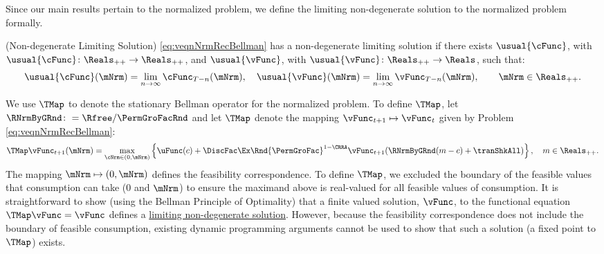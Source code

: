 \documentclass[BufferStockTheory]{subfiles}
\begin{document}
\hypertarget{sensible}{}\hypertarget{useful}{}
\hypertarget{Definition-of-a-Nondegenerate-Solution and Bellman}{}
Since our main results pertain to the normalized problem, we define the limiting non-degenerate solution to the normalized problem formally.

\begin{definition}\label{def:nondegeneracy}(Non-degenerate Limiting Solution)
\ref{eq:veqnNrmRecBellman} has a non-degenerate limiting solution if there exists $ \usual{\cFunc}$, with $\usual{\cFunc}\colon \Reals_{++}\rightarrow \Reals_{++}$, and $ \usual{\vFunc}$, with $\usual{\vFunc}\colon \Reals_{++}\rightarrow \Reals$, such that:
%
\begin{align*}
  \usual{\cFunc}(\mNrm) =  \lim_{n \rightarrow \infty} \cFunc_{T-n}(\mNrm), \quad \usual{\vFunc}(\mNrm)  =  \lim_{n \rightarrow \infty} \vFunc_{T-n}(\mNrm), \qquad \mNrm \in \Reals_{++} \notag.
\end{align*}
\end{definition}


\hypertarget{Stationary-Bellman-Operator}{}

We use $\TMap$ to denote the stationary Bellman operator for the normalized problem. To define $\TMap$, let $\RNrmByGRnd \colon = \Rfree/\PermGroFacRnd$ and let $\TMap$ denote the mapping $\vFunc_{t+1} \mapsto \vFunc_{t}$ given by Problem \ref{eq:veqnNrmRecBellman}:
%
\begin{equation}\label{eq:maintmap}
  \TMap \vFunc_{t+1}(\mNrm) = \max_{\cNrm \in (0, \mNrm) }  \left\{
    \uFunc(c) + \DiscFac\Ex\Rnd{\PermGroFac}^{1-\CRRA}\vFunc_{t+1}(\RNrmByGRnd(m - c) + \tranShkAll)
  \right\}, \quad m \in \Reals_{++}.  
\end{equation}
%
The mapping $\mNrm\mapsto (0, \mNrm)$ defines the feasibility correspondence. To define $\TMap$, we excluded the boundary of the feasible values that consumption can take ($0$ and $\mNrm$) to ensure the maximand above is real-valued for all feasible values of consumption. It is straightforward to show (using the Bellman Principle of Optimality) that a finite valued solution, $\vFunc$, to the functional equation $\TMap\vFunc = \vFunc$ defines a \hyperlink{sensible}{limiting non-degenerate solution}. However, because the feasibility correspondence does not include the boundary of feasible consumption, existing dynamic programming arguments cannot be used to show that such a solution (a fixed point to $\TMap$) exists. 
\end{document}
